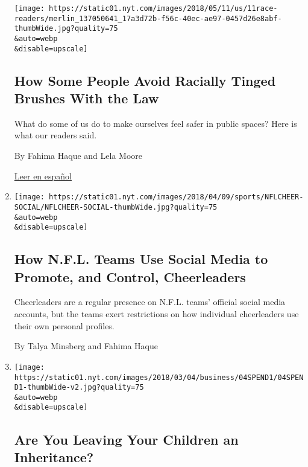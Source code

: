 \begin{enumerate}
  \texttt{[image: https://static01.nyt.com/images/2018/05/11/us/11race-readers/merlin\_137050641\_17a3d72b-f56c-40ec-ae97-0457d26e8abf-thumbWide.jpg?quality=75\\\&auto=webp\\\&disable=upscale]}

  \hypertarget{how-some-people-avoid-racially-tinged-brushes-with-the-law}{%
  \subsection{How Some People Avoid Racially Tinged Brushes With the
  Law}\label{how-some-people-avoid-racially-tinged-brushes-with-the-law}}

  What do some of us do to make ourselves feel safer in public spaces?
  Here is what our readers said.

  By Fahima Haque and Lela Moore

  \href{https://www.nytimes.com/es/2018/05/16/racismo-estados-unidos-negros-arresto/}{Leer
  en español}
\item
  \href{/2018/04/11/sports/nfl-cheerleaders.html}{}

  \texttt{[image: https://static01.nyt.com/images/2018/04/09/sports/NFLCHEER-SOCIAL/NFLCHEER-SOCIAL-thumbWide.jpg?quality=75\\\&auto=webp\\\&disable=upscale]}

  \hypertarget{how-nfl-teams-use-social-media-to-promote-and-control-cheerleaders}{%
  \subsection{How N.F.L. Teams Use Social Media to Promote, and Control,
  Cheerleaders}\label{how-nfl-teams-use-social-media-to-promote-and-control-cheerleaders}}

  Cheerleaders are a regular presence on N.F.L. teams' official social
  media accounts, but the teams exert restrictions on how individual
  cheerleaders use their own personal profiles.

  By Talya Minsberg and Fahima Haque
\item
  \href{/2018/02/27/business/retirement/are-you-leaving-your-children-an-inheritance.html}{}

  \texttt{[image: https://static01.nyt.com/images/2018/03/04/business/04SPEND1/04SPEND1-thumbWide-v2.jpg?quality=75\\\&auto=webp\\\&disable=upscale]}

  \hypertarget{are-you-leaving-your-children-an-inheritance}{%
  \subsection{Are You Leaving Your Children an
  Inheritance?}\label{are-you-leaving-your-children-an-inheritance}}


\end{enumerate}
